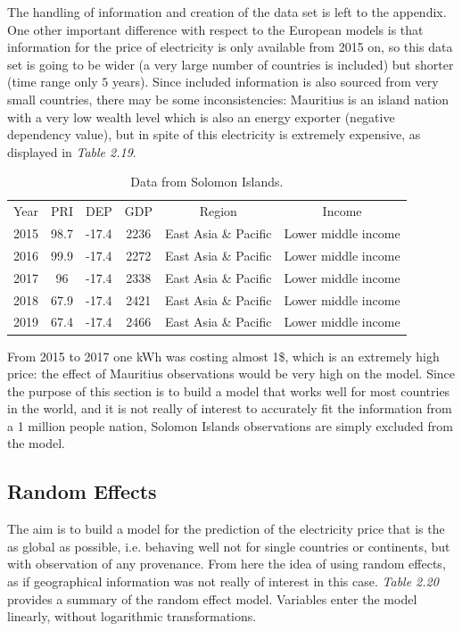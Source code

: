 \documentclass{book}
\begin{document}
The handling of information and creation of the data set is left to the appendix. One other important difference with respect to the European models is that information for the price of electricity is only available from 2015 on, so this data set is going to be wider (a very large number of countries is included) but shorter (time range only $5$ years). Since included information is also sourced from very small countries, there may be some inconsistencies: Mauritius is an island nation with a very low wealth level which is also an energy exporter (negative dependency value), but in spite of this electricity is extremely expensive, as displayed in \textit{Table 2.19}. 

\bigskip
\begin{table}[H]
\begin{center}
\begin{tabular}{|c|c|c|c|c|c|}
\hline
\rowcolor{maroon} \multicolumn{6}{|c|}{Data from Solomon Islands}\\
\hline
Year&PRI&DEP&GDP&Region&Income\\
\hline
2015&98.7&-17.4&2236&East Asia \& Pacific&Lower middle income\\
2016&99.9&-17.4&2272&East Asia \& Pacific&Lower middle income\\
2017&96&-17.4&2338&East Asia \& Pacific&Lower middle income\\
2018&67.9&-17.4&2421&East Asia \& Pacific&Lower middle income\\
2019&67.4&-17.4&2466&East Asia \& Pacific&Lower middle income\\
\hline
\end{tabular}
\caption{Data from Solomon Islands.}
\end{center}
\end{table}
\bigskip

From 2015 to 2017 one kWh was costing almost 1\$, which is an extremely high price: the effect of Mauritius observations would be very high on the model. Since the purpose of this section is to build a model that works well for most countries in the world, and it is not really of interest to accurately fit the information from a 1 million people nation, Solomon Islands observations are simply excluded from the model.

\subsection{Random Effects}

The aim is to build a model for the prediction of the electricity price that is the as global as possible, i.e. behaving well not for single countries or continents, but with observation of any provenance. From here the idea of using random effects, as if geographical information was not really of interest in this case. \textit{Table 2.20} provides a summary of the random effect model. Variables enter the model linearly, without logarithmic transformations.
\end{document}
